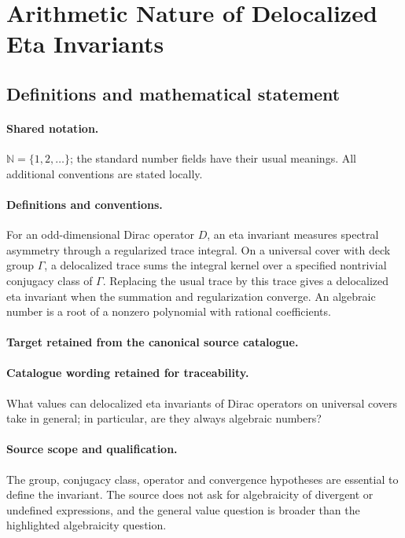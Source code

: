 \documentclass[11pt]{article}
\begin{document}
\section{Arithmetic Nature of Delocalized Eta Invariants}\label{statement}

\subsection{Definitions and mathematical statement}

\paragraph{Shared notation.}$\mathbb N=\{1,2,\ldots\}$; the standard number fields have their usual meanings. All additional conventions are stated locally.


\paragraph{Definitions and conventions.}
For an odd-dimensional Dirac operator $D$, an eta invariant measures spectral asymmetry through a regularized trace integral. On a universal cover with deck group $\Gamma$, a delocalized trace sums the integral kernel over a specified nontrivial conjugacy class of $\Gamma$. Replacing the usual trace by this trace gives a delocalized eta invariant when the summation and regularization converge. An algebraic number is a root of a nonzero polynomial with rational coefficients.

\paragraph{Target retained from the canonical source catalogue.}
\paragraph{Catalogue wording retained for traceability.}
What values can delocalized eta invariants of Dirac operators on universal covers take in general; in particular, are they always algebraic numbers?

\paragraph{Source scope and qualification.}
The group, conjugacy class, operator and convergence hypotheses are essential to define the invariant. The source does not ask for algebraicity of divergent or undefined expressions, and the general value question is broader than the highlighted algebraicity question.
\end{document}
